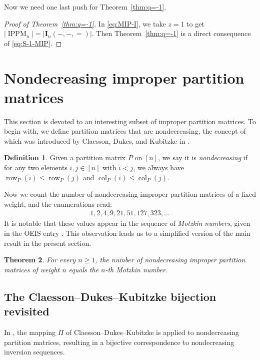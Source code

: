 \documentclass[12pt,reqno]{amsart}
\numberwithin{equation}{section}
\theoremstyle{theorem}
\newtheorem{theorem}{Theorem}[section]
\theoremstyle{definition}
\newtheorem{definition}[theorem]{Definition}
\theoremstyle{named}
\newcommand{\OEIS}[1]{\href{https://oeis.org/#1}{#1}}
\newcommand{\col}{\operatorname{col}}
\newcommand{\row}{\operatorname{row}}
\newcommand{\bI}{\mathbf{I}}
\newcommand{\IPPM}{\operatorname{IPPM}}
\begin{document}
Now we need one last push for Theorem~\ref{thm:q=-1}.

\begin{proof}[Proof of Theorem~\ref{thm:q=-1}]
	In \eqref{eq:MIP-I}, we take $z=1$ to get $|\IPPM_{n}| = |\bI_n(-,-,=)|$. Then Theorem~\ref{thm:q=-1} is a direct consequence of \eqref{eq:S-1-MIP}.
\end{proof}


\section{Nondecreasing improper partition matrices}\label{sec:NIPM}

This section is devoted to an interesting subset of improper partition matrices. To begin with, we define partition matrices that are nondecreasing, the concept of which was introduced by Claesson, Dukes, and Kubitzke in \cite[p.~1628, Section~2.2]{CDK2011}.

\begin{definition}\label{def:NDPM}
	Given a partition matrix $P$ on $[n]$, we say it is \emph{nondecreasing} if for any two elements $i,j\in [n]$ with $i<j$, we always have $\row_P(i)\le \row_P(j)$ and $\col_P(i)\le \col_P(j)$.
\end{definition}

Now we count the number of nondecreasing improper partition matrices of a fixed weight, and the enumerations read:
\begin{align*}
	1, 2, 4, 9, 21, 51, 127, 323, \ldots
\end{align*}
It is notable that these values appear in the sequence of \emph{Motzkin numbers}, given in the OEIS entry \cite[\OEIS{A001006}]{OEIS}. This observation leads us to a simplified version of the main result in the present section.

\begin{theorem}\label{th:NDIPPM-Motzkin-simple}
	For every $n\ge 1$, the number of nondecreasing improper partition matrices of weight $n$ equals the $n$-th Motzkin number.
\end{theorem}

\subsection{The Claesson--Dukes--Kubitzke bijection revisited}\label{sec:CDK-block}

In \cite[p.~1628, Theorem~8]{CDK2011}, the mapping $\Pi$ of Claesson--Dukes--Kubitzke is applied to nondecreasing partition matrices, resulting in a bijective correspondence to nondecreasing inversion sequences.
\end{document}
